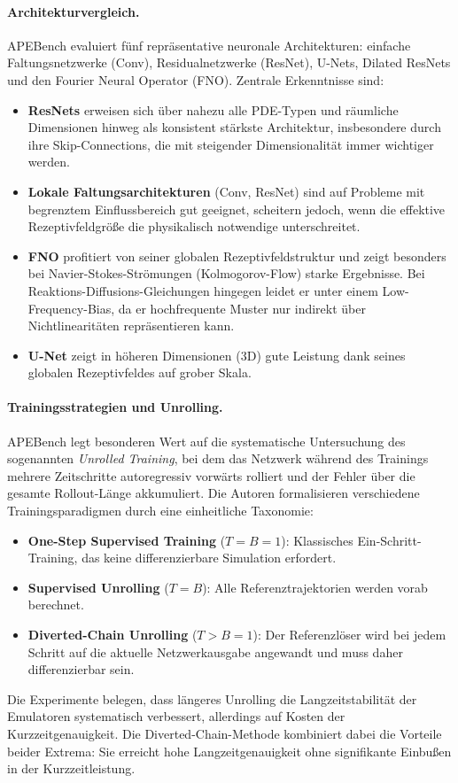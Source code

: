 \documentclass[a4paper,12pt]{article}
\begin{document}
\paragraph{Architekturvergleich.}
APEBench evaluiert fünf repräsentative neuronale Architekturen: einfache Faltungsnetzwerke (Conv), Residualnetzwerke (ResNet), U-Nets, Dilated ResNets und den Fourier Neural Operator (FNO). Zentrale Erkenntnisse sind:
\begin{itemize}
  \item \textbf{ResNets} erweisen sich über nahezu alle PDE-Typen und räumliche Dimensionen hinweg als konsistent stärkste Architektur, insbesondere durch ihre Skip-Connections, die mit steigender Dimensionalität immer wichtiger werden.
  \item \textbf{Lokale Faltungsarchitekturen} (Conv, ResNet) sind auf Probleme mit begrenztem Einflussbereich gut geeignet, scheitern jedoch, wenn die effektive Rezeptivfeldgröße die physikalisch notwendige unterschreitet.
  \item \textbf{FNO} profitiert von seiner globalen Rezeptivfeldstruktur und zeigt besonders bei Navier-Stokes-Strömungen (Kolmogorov-Flow) starke Ergebnisse. Bei Reaktions-Diffusions-Gleichungen hingegen leidet er unter einem Low-Frequency-Bias, da er hochfrequente Muster nur indirekt über Nichtlinearitäten repräsentieren kann.
  \item \textbf{U-Net} zeigt in höheren Dimensionen (3D) gute Leistung dank seines globalen Rezeptivfeldes auf grober Skala.
\end{itemize}

\paragraph{Trainingsstrategien und Unrolling.}
APEBench legt besonderen Wert auf die systematische Untersuchung des sogenannten \textit{Unrolled Training}, bei dem das Netzwerk während des Trainings mehrere Zeitschritte autoregressiv vorwärts rolliert und der Fehler über die gesamte Rollout-Länge akkumuliert. Die Autoren formalisieren verschiedene Trainingsparadigmen durch eine einheitliche Taxonomie:
\begin{itemize}
  \item \textbf{One-Step Supervised Training} ($T = B = 1$): Klassisches Ein-Schritt-Training, das keine differenzierbare Simulation erfordert.
  \item \textbf{Supervised Unrolling} ($T = B$): Alle Referenztrajektorien werden vorab berechnet.
  \item \textbf{Diverted-Chain Unrolling} ($T > B = 1$): Der Referenzlöser wird bei jedem Schritt auf die aktuelle Netzwerkausgabe angewandt und muss daher differenzierbar sein.
\end{itemize}
Die Experimente belegen, dass längeres Unrolling die Langzeitstabilität der Emulatoren systematisch verbessert, allerdings auf Kosten der Kurzzeitgenauigkeit. Die Diverted-Chain-Methode kombiniert dabei die Vorteile beider Extrema: Sie erreicht hohe Langzeitgenauigkeit ohne signifikante Einbußen in der Kurzzeitleistung.
\end{document}
